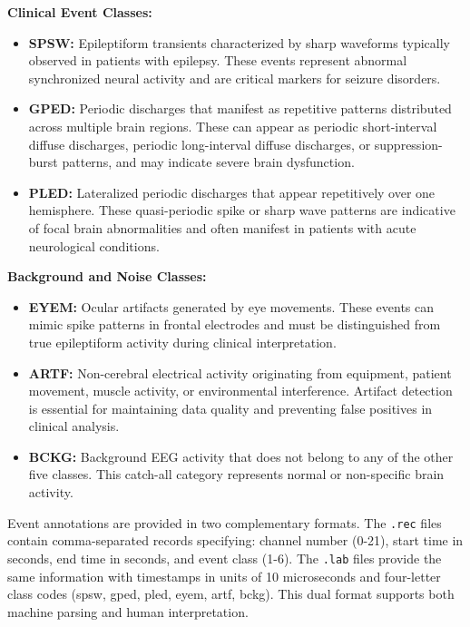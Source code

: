 \textbf{Clinical Event Classes:}
\begin{itemize}
    \item \textbf{\ac{SPSW}:} Epileptiform transients characterized by sharp waveforms typically observed in patients with epilepsy. These events represent abnormal synchronized neural activity and are critical markers for seizure disorders.
    
    \item \textbf{\ac{GPED}:} Periodic discharges that manifest as repetitive patterns distributed across multiple brain regions. These can appear as periodic short-interval diffuse discharges, periodic long-interval diffuse discharges, or suppression-burst patterns, and may indicate severe brain dysfunction.
    
    \item \textbf{\ac{PLED}:} Lateralized periodic discharges that appear repetitively over one hemisphere. These quasi-periodic spike or sharp wave patterns are indicative of focal brain abnormalities and often manifest in patients with acute neurological conditions.
\end{itemize}

\textbf{Background and Noise Classes:}
\begin{itemize}
    \item \textbf{\ac{EYEM}:} Ocular artifacts generated by eye movements. These events can mimic spike patterns in frontal electrodes and must be distinguished from true epileptiform activity during clinical interpretation.
    
    \item \textbf{\ac{ARTF}:} Non-cerebral electrical activity originating from equipment, patient movement, muscle activity, or environmental interference. Artifact detection is essential for maintaining data quality and preventing false positives in clinical analysis.
    
    \item \textbf{\ac{BCKG}:} Background \ac{EEG} activity that does not belong to any of the other five classes. This catch-all category represents normal or non-specific brain activity.
\end{itemize}

Event annotations are provided in two complementary formats. The \texttt{.rec} files contain comma-separated records specifying: channel number (0-21), start time in seconds, end time in seconds, and event class (1-6). The \texttt{.lab} files provide the same information with timestamps in units of 10 microseconds and four-letter class codes (spsw, gped, pled, eyem, artf, bckg). This dual format supports both machine parsing and human interpretation.

